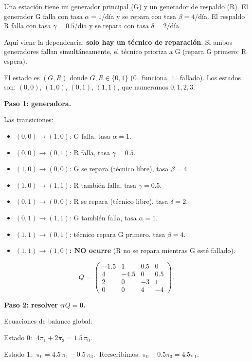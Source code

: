 \documentclass[11pt,a4paper]{article}
\theoremstyle{definition}
\theoremstyle{remark}
\begin{document}
\begin{ejemplo}
Una estación tiene un generador principal (G) y un generador de respaldo
(R).  El generador G falla con tasa $\alpha=1$/día y se repara con
tasa $\beta=4$/día.  El respaldo R falla con tasa $\gamma=0.5$/día y
se repara con tasa $\delta=2$/día.

Aquí viene la dependencia: \textbf{solo hay un técnico de reparación}.
Si ambos generadores fallan simultáneamente, el técnico prioriza a G
(repara G primero; R espera).

El estado es $(G,R)$ donde $G,R\in\{0,1\}$ ($0$=funciona, $1$=fallado).
Los estados son: $(0,0)$, $(1,0)$, $(0,1)$, $(1,1)$, que numeramos
$0,1,2,3$.

\tcblower

\textbf{Paso 1: generadora.}

Las transiciones:
\begin{itemize}[nosep]
  \item $(0,0)\to(1,0)$: G falla, tasa $\alpha=1$.
  \item $(0,0)\to(0,1)$: R falla, tasa $\gamma=0.5$.
  \item $(1,0)\to(0,0)$: G se repara (técnico libre), tasa $\beta=4$.
  \item $(1,0)\to(1,1)$: R también falla, tasa $\gamma=0.5$.
  \item $(0,1)\to(0,0)$: R se repara (técnico libre), tasa $\delta=2$.
  \item $(0,1)\to(1,1)$: G también falla, tasa $\alpha=1$.
  \item $(1,1)\to(0,1)$: técnico repara G primero, tasa $\beta=4$.
  \item \textbf{$(1,1)\to(1,0)$: NO ocurre} (R no se repara mientras G
        esté fallado).
\end{itemize}

\[
  Q = \begin{pmatrix}
    -1.5 & 1   & 0.5 & 0    \\
    4    & -4.5 & 0   & 0.5  \\
    2    & 0   & -3  & 1    \\
    0    & 0   & 4   & -4
  \end{pmatrix}.
\]

\textbf{Paso 2: resolver $\boldsymbol{\pi}Q = \boldsymbol{0}$.}

Ecuaciones de balance global:

Estado 0: $\;4\pi_1 + 2\pi_2 = 1.5\,\pi_0.$

Estado 1: $\;\pi_0 = 4.5\,\pi_1 - 0.5\,\pi_3.\;$ Reescribimos:
$\pi_0 + 0.5\pi_3 = 4.5\pi_1.$


\end{ejemplo}
\end{document}
